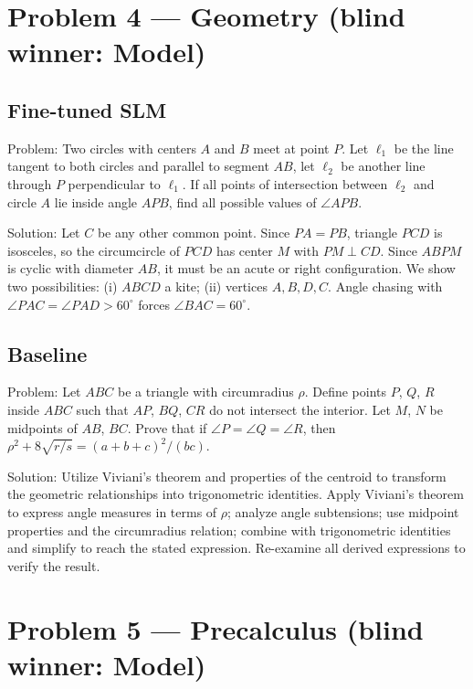 \documentclass[11pt]{article}
\begin{document}
\section*{Problem 4 --- Geometry \quad(blind winner: Model)}

\subsection*{Fine-tuned SLM}

Problem:
Two circles with centers $A$ and $B$ meet at point $P$. Let $\ell_1$ be the line tangent to both circles and parallel to segment $AB$, let $\ell_2$ be another line through $P$ perpendicular to $\ell_1$. If all points of intersection between $\ell_2$ and circle $A$ lie inside angle $APB$, find all possible values of $\angle APB$.

Solution:
Let $C$ be any other common point. Since $PA = PB$, triangle $PCD$ is isosceles, so the circumcircle of $PCD$ has center $M$ with $PM \perp CD$. Since $ABPM$ is cyclic with diameter $AB$, it must be an acute or right configuration. We show two possibilities: (i) $ABCD$ a kite; (ii) vertices $A,B,D,C$. Angle chasing with $\angle PAC = \angle PAD > 60^\circ$ forces $\angle BAC = 60^\circ$.

\subsection*{Baseline}

Problem:
Let $ABC$ be a triangle with circumradius $\rho$. Define points $P$, $Q$, $R$ inside $ABC$ such that $AP$, $BQ$, $CR$ do not intersect the interior. Let $M$, $N$ be midpoints of $AB$, $BC$. Prove that if $\angle P = \angle Q = \angle R$, then $\rho^2 + 8\sqrt{r/s} = (a+b+c)^2/(bc)$.

Solution:
Utilize Viviani's theorem and properties of the centroid to transform the geometric relationships into trigonometric identities. Apply Viviani's theorem to express angle measures in terms of $\rho$; analyze angle subtensions; use midpoint properties and the circumradius relation; combine with trigonometric identities and simplify to reach the stated expression. Re-examine all derived expressions to verify the result.

\section*{Problem 5 --- Precalculus \quad(blind winner: Model)}
\end{document}
